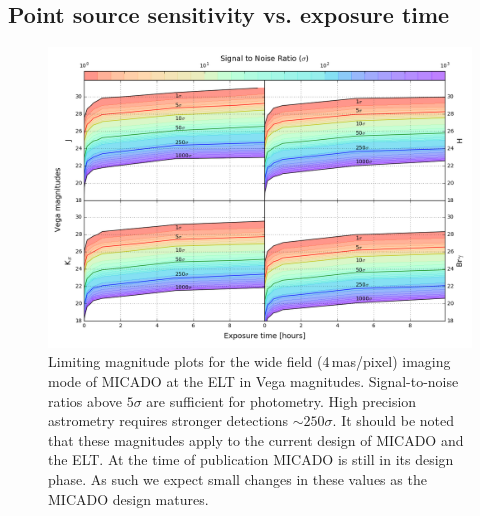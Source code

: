 \subsection{Point source sensitivity vs. exposure time}

\begin{figure}

    \centering
    \includegraphics[width=\textwidth]{images/MICADO_SNR_Rainbow_JHKBrG_vega}

    \caption{Limiting magnitude plots for the wide field (4\,mas/pixel) imaging mode of MICADO at the ELT in Vega magnitudes. Signal-to-noise ratios above $5\sigma$ are sufficient for photometry. High precision astrometry requires stronger detections $\sim 250\sigma$. It should be noted that these magnitudes apply to the current design of MICADO and the ELT. At the time of publication MICADO is still in its design phase. As such we expect small changes in these values as the MICADO design matures.}
    
    \label{fig:point_source_sensitivities}
    
\end{figure}






